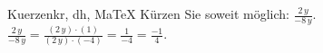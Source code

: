 \begin{MAufgabe}{Kuerzen}{kr, dh, MaTeX}
K\"urzen Sie soweit m\"oglich: $\frac{2\, y}{- 8\, y}$.\\ 
\ifLsg\MLoesung
\quad $\frac{2\, y}{- 8\, y}=\frac{(2\, y)\cdot(1)}{(2\, y)\cdot(-4)}=\frac{1}{-4}=\frac{-1}{4}$.\else\relax\fi
 \end{MAufgabe}